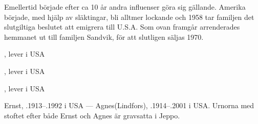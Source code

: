 Emellertid började efter ca 10 år andra influenser göra sig gällande. Amerika började, med hjälp av släktingar, bli alltmer lockande och 1958 tar familjen det slutgiltiga beslutet att emigrera till U.S.A. Som ovan framgår arrenderades hemmanet ut till familjen Sandvik, för att slutligen säljas 1970.
\begin{jhchildren}
  \item {}, lever i USA
  \item {}, lever i USA
  \item {}, lever i USA
\end{jhchildren}
Ernst, .1913--.1992 i USA  ---  Agnes(Lindfors), .1914--.2001 i USA. Urnorna med stoftet efter både Ernst och Agnes är gravsatta i Jeppo.
